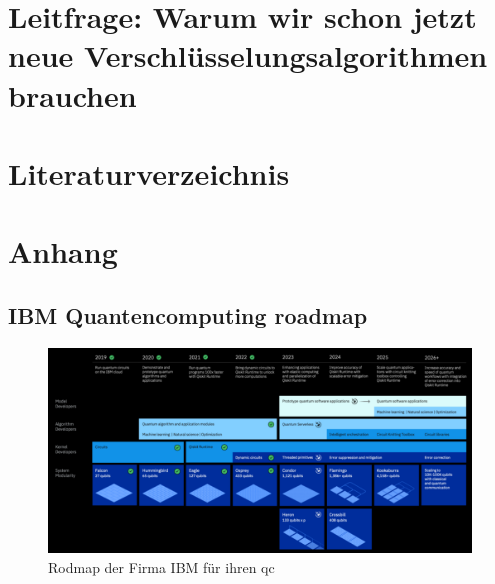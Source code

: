 \documentclass[conference]{IEEEtran}
\begin{document}
\section{Leitfrage: Warum wir schon jetzt neue Verschlüsselungsalgorithmen brauchen}


%

\section*{Literaturverzeichnis}
\printbibliography[heading=none]{}

\pagebreak
\section{Anhang}

\subsection{IBM Quantencomputing roadmap}
\begin{figure}[!hbt]
  \centering
  \includegraphics[width=\textwidth]{./images/ibm-roadmap.png}
  \caption{Rodmap der Firma IBM für ihren \ac{qc} \cite{noauthor_ibm_2015}}
  \label{fig:ibm-rm}
\end{figure}
\end{document}
